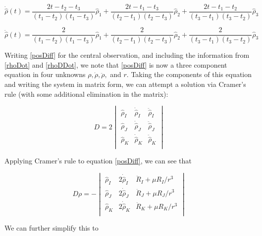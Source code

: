 \documentclass[11pt,twoside,letterpaper]{article}
\begin{document}
  \begin{equation} \label{rhoDot}
    \dot{\hat{\rho}}(t) =
    \frac{2t - t_2 - t_3}{(t_1 - t_2)(t_1 - t_3)}\hat{\rho}_1
      + \frac{2t - t_1 - t_3}{(t_2 - t_1)(t_2 - t_3)}\hat{\rho}_2
      + \frac{2t - t_1 - t_2}{(t_3 - t_1)(t_3 - t_2)}\hat{\rho}_3
  \end{equation}

  \begin{equation} \label{rhoDDot}
    \ddot{\hat{\rho}}(t) =
    \frac{2}{(t_1 - t_2)(t_1 - t_3)}\hat{\rho}_1
      + \frac{2}{(t_2 - t_1)(t_2 - t_3)}\hat{\rho}_2
      + \frac{2}{(t_3 - t_1)(t_3 - t_2)}\hat{\rho}_3
  \end{equation}

  Writing \ref{posDiff} for the central observation, and including the
  information from \ref{rhoDot} and \ref{rhoDDot}, we note that
  \ref{posDiff} is now a three component equation in four unknowns
  $\rho, \dot{\rho}, \ddot{\rho},$ and $r$. Taking the components of
  this equation and writing the system in matrix form, we can attempt
  a solution via Cramer's rule (with some additional elimination in
  the matrix):

  \begin{equation} \label{D}
    D = 2\begin{vmatrix}
    \hat{\rho}_I& \dot{\hat{\rho}}_I& \ddot{\hat{\rho}}_I \\
    \hat{\rho}_J& \dot{\hat{\rho}}_J& \ddot{\hat{\rho}}_J \\
    \hat{\rho}_K& \dot{\hat{\rho}}_K& \ddot{\hat{\rho}}_K \\
    \end{vmatrix}
  \end{equation}

  Applying Cramer's rule to equation \ref{posDiff}, we can see that

  \begin{equation} \label{slantRange1}
    D\rho = -\begin{vmatrix}
    \hat{\rho}_I& 2\dot{\hat{\rho}}_I& \ddot{R}_I
    + \mu R_I/r^3 \\
    \hat{\rho}_J& 2\dot{\hat{\rho}}_J& \ddot{R}_J
    + \mu R_J/r^3 \\
    \hat{\rho}_K& 2\dot{\hat{\rho}}_K& \ddot{R}_K
    + \mu R_K/r^3 \\
    \end{vmatrix}
  \end{equation}

  We can further simplify this to
\end{document}
